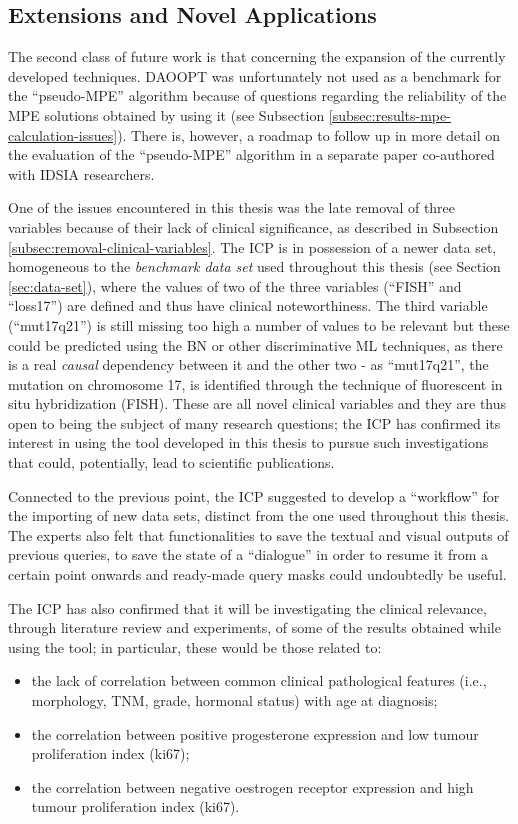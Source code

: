 \subsection{Extensions and Novel Applications}
The second class of future work is that concerning the expansion of the currently developed techniques.
DAOOPT was unfortunately not used as a benchmark for the \enquote{pseudo-MPE} algorithm because of questions regarding the reliability of the MPE solutions obtained by using it (see Subsection \ref{subsec:results-mpe-calculation-issues}).
There is, however, a roadmap to follow up in more detail on the evaluation of the \enquote{pseudo-MPE} algorithm in a separate paper co-authored with IDSIA researchers.

One of the issues encountered in this thesis was the late removal of three variables because of their lack of clinical significance, as described in Subsection \ref{subsec:removal-clinical-variables}.
The ICP is in possession of a newer data set, homogeneous to the \textit{benchmark data set} used throughout this thesis (see Section \ref{sec:data-set}), where the values of two of the three variables (\enquote{FISH} and \enquote{loss17}) are defined and thus have clinical noteworthiness.
The third variable (\enquote{mut17q21}) is still missing too high a number of values to be relevant but these could be predicted using the BN or other discriminative ML techniques, as there is a real \textit{causal} dependency between it and the other two - as \enquote{mut17q21}, the mutation on chromosome 17, is identified through the technique of fluorescent in situ hybridization (FISH).
These are all novel clinical variables and they are thus open to being the subject of many research questions; the ICP has confirmed its interest in using the tool developed in this thesis to pursue such investigations that could, potentially, lead to scientific publications.

Connected to the previous point, the ICP suggested to develop a \enquote{workflow} for the importing of new data sets, distinct from the one used throughout this thesis.
The experts also felt that functionalities to save the textual and visual outputs of previous queries, to save the state of a \enquote{dialogue} in order to resume it from a certain point onwards and ready-made query masks could undoubtedly be useful.

The ICP has also confirmed that it will be investigating the clinical relevance, through literature review and experiments, of some of the results obtained while using the tool; in particular, these would be those related to:
\begin{itemize}
  \item the lack of correlation between common clinical pathological features (i.e., morphology, TNM, grade, hormonal status) with age at diagnosis;
  \item the correlation between positive progesterone expression and low tumour proliferation index (ki67);
  \item the correlation between negative oestrogen receptor expression and high tumour proliferation index (ki67).
\end{itemize}

